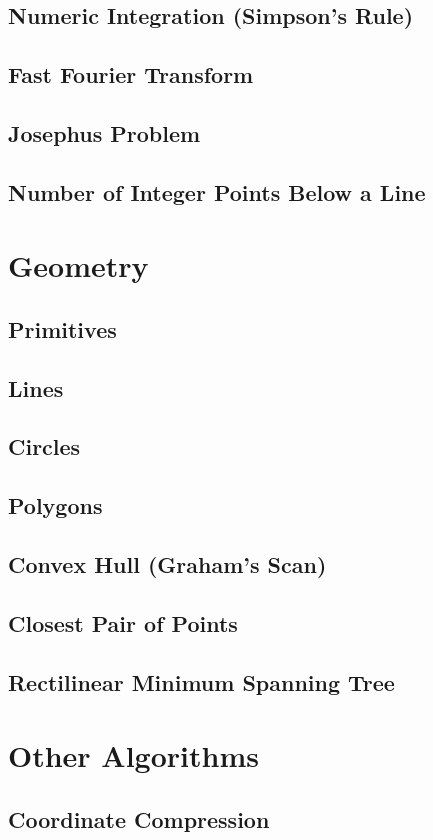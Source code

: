 \documentclass[8pt,a4paper,landscape,oneside]{amsart}
\begin{document}
\begin{multicols*}{3}
	\subsection{Numeric Integration (Simpson's Rule)}
	\subsection{Fast Fourier Transform}
	\subsection{Josephus Problem}
	\subsection{Number of Integer Points Below a Line}
\section{Geometry}
	\subsection{Primitives}
	\subsection{Lines}
	\subsection{Circles}
	\subsection{Polygons}
	\subsection{Convex Hull (Graham's Scan)}
	\subsection{Closest Pair of Points}
	\subsection{Rectilinear Minimum Spanning Tree}
\section{Other Algorithms}
	\subsection{Coordinate Compression}

\end{multicols*}
\end{document}

